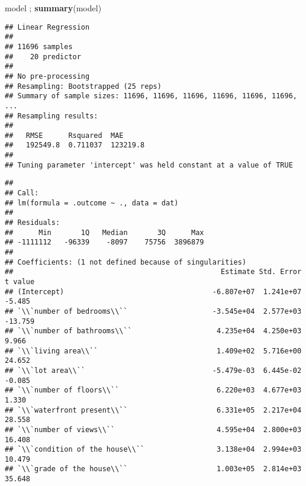 \documentclass[
]{article}
\newenvironment{Shaded}{\begin{snugshade}}{\end{snugshade}}
\newcommand{\FunctionTok}[1]{\textcolor[rgb]{0.13,0.29,0.53}{\textbf{#1}}}
\newcommand{\NormalTok}[1]{#1}
\begin{document}
\begin{Shaded}
\begin{Highlighting}[]
\NormalTok{model ; }\FunctionTok{summary}\NormalTok{(model)}
\end{Highlighting}
\end{Shaded}

\begin{verbatim}
## Linear Regression 
## 
## 11696 samples
##    20 predictor
## 
## No pre-processing
## Resampling: Bootstrapped (25 reps) 
## Summary of sample sizes: 11696, 11696, 11696, 11696, 11696, 11696, ... 
## Resampling results:
## 
##   RMSE      Rsquared  MAE     
##   192549.8  0.711037  123219.8
## 
## Tuning parameter 'intercept' was held constant at a value of TRUE
\end{verbatim}

\begin{verbatim}
## 
## Call:
## lm(formula = .outcome ~ ., data = dat)
## 
## Residuals:
##      Min       1Q   Median       3Q      Max 
## -1111112   -96339    -8097    75756  3896879 
## 
## Coefficients: (1 not defined because of singularities)
##                                                 Estimate Std. Error t value
## (Intercept)                                   -6.807e+07  1.241e+07  -5.485
## `\\`number of bedrooms\\``                    -3.545e+04  2.577e+03 -13.759
## `\\`number of bathrooms\\``                    4.235e+04  4.250e+03   9.966
## `\\`living area\\``                            1.409e+02  5.716e+00  24.652
## `\\`lot area\\``                              -5.479e-03  6.445e-02  -0.085
## `\\`number of floors\\``                       6.220e+03  4.677e+03   1.330
## `\\`waterfront present\\``                     6.331e+05  2.217e+04  28.558
## `\\`number of views\\``                        4.595e+04  2.800e+03  16.408
## `\\`condition of the house\\``                 3.138e+04  2.994e+03  10.479
## `\\`grade of the house\\``                     1.003e+05  2.814e+03  35.648

\end{verbatim}
\end{document}
